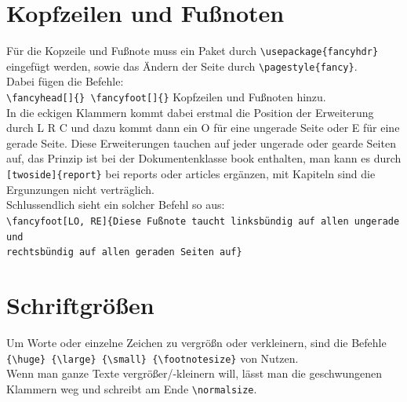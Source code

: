 \documentclass[ngerman]{scrreport}
\begin{document}
\section{Kopfzeilen und Fußnoten}
Für die Kopzeile und Fußnote muss ein Paket durch {\color{blue}\verb|\usepackage{fancyhdr}|} eingefügt werden, sowie das Ändern der Seite durch {\color{blue}\verb|\pagestyle{fancy}|}.\\
Dabei fügen die Befehle:\\
{\color{blue}\verb|\fancyhead[]{} \fancyfoot[]{}|} Kopfzeilen und Fußnoten hinzu.\\
In die eckigen Klammern kommt dabei erstmal die Position der Erweiterung durch {\color{blue}L R C} und dazu kommt dann ein {\color{blue}O} für eine ungerade Seite oder {\color{blue}E} für eine gerade Seite.
Diese Erweiterungen tauchen auf jeder ungerade oder gearde Seiten auf, das Prinzip ist bei der Dokumentenklasse book enthalten, man kann es durch {\color{blue}\verb|[twoside]{report}|} bei reports oder articles ergänzen, mit Kapiteln sind die Ergunzungen  nicht verträglich.\\
Schlussendlich sieht ein solcher Befehl so aus:\\
{\color{blue}\verb|\fancyfoot[LO, RE]{Diese Fußnote taucht linksbündig auf allen ungerade und|}\\
{\color{blue}\verb|rechtsbündig auf allen geraden Seiten auf}|}

\section{Schriftgrößen}
Um Worte oder einzelne Zeichen zu vergrößn oder verkleinern, sind die Befehle {\color{blue}\verb|{\huge} {\large} {\small} {\footnotesize}|} von Nutzen.\\
Wenn man ganze Texte vergrößer/-kleinern will, lässt man die geschwungenen Klammern weg und schreibt am Ende {\color{blue}\verb|\normalsize|}.
\end{document}
